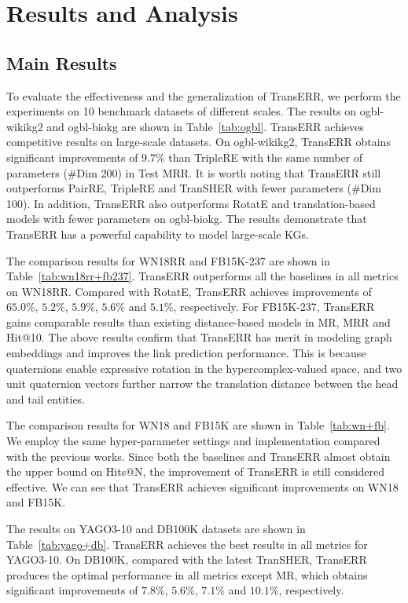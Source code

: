 \documentclass[10pt, a4paper]{article}
\begin{document}
\section{Results and Analysis}\label{sec6}

\subsection{Main Results}\label{sec6.1}

To evaluate the effectiveness and the generalization of TransERR, we perform the experiments on 10 benchmark datasets of different scales. The results on ogbl-wikikg2 and ogbl-biokg are shown in Table~\ref{tab:ogbl}. TransERR achieves competitive results on large-scale datasets. On ogbl-wikikg2,  TransERR obtains significant improvements of $9.7\%$ than TripleRE with the same number of parameters (\#Dim 200) in Test MRR.  It is worth noting that TransERR still outperforms PairRE, TripleRE and TranSHER with fewer parameters (\#Dim 100). In addition, TransERR also outperforms RotatE and translation-based models with fewer parameters on ogbl-biokg. The results demonstrate that TransERR has a powerful capability to model large-scale KGs.







The comparison results for WN18RR and FB15K-237 are shown in Table~\ref{tab:wn18rr+fb237}. TransERR outperforms all the baselines in all metrics on WN18RR. Compared with RotatE, TransERR achieves improvements of $65.0\%$, $5.2\%$, $5.9\%$, $5.6\%$ and $5.1\%$, respectively. For FB15K-237, TransERR gains comparable results than existing distance-based models in MR, MRR and Hit@10. The above results confirm that TransERR has merit in modeling graph embeddings and improves the link prediction performance. This is because quaternions enable expressive rotation in the hypercomplex-valued space, and two unit quaternion vectors further narrow the translation distance between the head and tail entities. 


The comparison results for WN18 and FB15K are shown in Table~\ref{tab:wn+fb}. We employ the same hyper-parameter settings and implementation compared with the previous works.  Since both the baselines and TransERR almost obtain the upper bound on Hits@N, the improvement of TransERR is still considered effective. We can see that TransERR achieves significant improvements on WN18 and FB15K.


The results on YAGO3-10 and DB100K datasets are shown in Table~\ref{tab:yago+db}. TransERR achieves the best results in all metrics for YAGO3-10. On DB100K, compared with the latest TranSHER, TransERR produces the optimal performance in all metrics except MR, which obtains significant improvements of $7.8\%$, $5.6\%$, $7.1\%$ and $10.1\%$, respectively.
\end{document}
